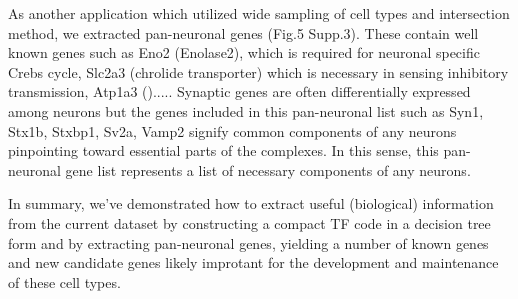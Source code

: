 As another application which utilized wide sampling of cell types and intersection method, we  extracted pan-neuronal genes (Fig.5 Supp.3). These contain well known genes such as Eno2 (Enolase2), which is required for neuronal specific Crebs cycle, Slc2a3 (chrolide transporter) which is necessary in sensing inhibitory transmission, Atp1a3 ().....  Synaptic genes are often differentially expressed among neurons but the genes included in this pan-neuronal list such as Syn1, Stx1b, Stxbp1, Sv2a, Vamp2 signify common components of any neurons pinpointing toward essential parts of the complexes. In this sense, this pan-neuronal gene list represents a list of necessary components of any neurons.

In summary, we've demonstrated how to extract useful (biological) information from the current dataset by constructing a compact TF code in a decision tree form and by extracting pan-neuronal genes, yielding a number of known genes and new candidate genes likely improtant for the development and maintenance of these cell types.
